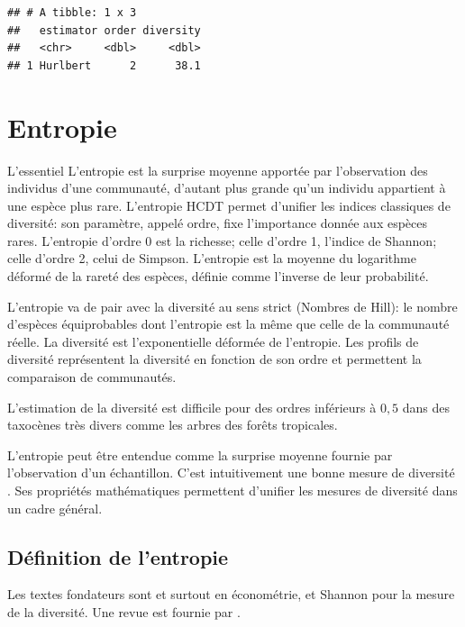 \documentclass[
  11pt,
  american,
  a4paper,
  extrafontsizes,onecolumn,openright
  ]{memoir}
\newenvironment{Summary}
  {\begin{bclogo}[logo=\bctrombone, noborder=true, couleur=lightgray!50]{L'essentiel}\parindent0pt}
  {\end{bclogo}}
\begin{document}
\begin{verbatim}
## # A tibble: 1 x 3
##   estimator order diversity
##   <chr>     <dbl>     <dbl>
## 1 Hurlbert      2      38.1
\end{verbatim}

\normalsize

\chapter{Entropie}\label{entropie}

\begin{Summary}
L'entropie est la surprise moyenne apportée par l'observation des individus d'une communauté, d'autant plus grande qu'un individu appartient à une espèce plus rare.
L'entropie HCDT permet d'unifier les indices classiques de diversité: son paramètre, appelé ordre, fixe l'importance donnée aux espèces rares. L'entropie d'ordre 0 est la richesse; celle d'ordre 1, l'indice de Shannon; celle d'ordre 2, celui de Simpson.
L'entropie est la moyenne du logarithme déformé de la rareté des espèces, définie comme l'inverse de leur probabilité.

L'entropie va de pair avec la diversité au sens strict (Nombres de Hill): le nombre d'espèces équiprobables dont l'entropie est la même que celle de la communauté réelle.
La diversité est l'exponentielle déformée de l'entropie.
Les profils de diversité représentent la diversité en fonction de son ordre et permettent la comparaison de communautés.

L'estimation de la diversité est difficile pour des ordres inférieurs à \(0,5\) dans des taxocènes très divers comme les arbres des forêts tropicales.

\end{Summary}

L'entropie peut être entendue comme la surprise moyenne fournie par l'observation d'un échantillon.
C'est intuitivement une bonne mesure de diversité \autocite{Pielou1975}.
Ses propriétés mathématiques permettent d'unifier les mesures de diversité dans un cadre général.

\section{Définition de l'entropie}\label{duxe9finition-de-lentropie}

Les textes fondateurs sont \textcite{Davis1941} et surtout \textcite{Theil1967} en économétrie, et Shannon \autocite*{Shannon1948,Shannon1963} pour la mesure de la diversité.
Une revue est fournie par \textcite{Maasoumi1993}.
\end{document}
